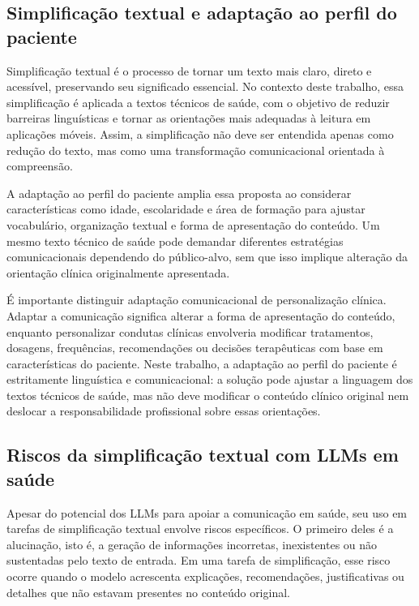 \subsection{Simplificação textual e adaptação ao perfil do paciente}
\label{sec:simplificacao-textual-adaptacao-perfil-paciente}

Simplificação textual é o processo de tornar um texto mais claro, direto e acessível, preservando seu significado essencial. No contexto deste trabalho, essa simplificação é aplicada a textos técnicos de saúde, com o objetivo de reduzir barreiras linguísticas e tornar as orientações mais adequadas à leitura em aplicações móveis. Assim, a simplificação não deve ser entendida apenas como redução do texto, mas como uma transformação comunicacional orientada à compreensão.

A adaptação ao perfil do paciente amplia essa proposta ao considerar características como idade, escolaridade e área de formação para ajustar vocabulário, organização textual e forma de apresentação do conteúdo. Um mesmo texto técnico de saúde pode demandar diferentes estratégias comunicacionais dependendo do público-alvo, sem que isso implique alteração da orientação clínica originalmente apresentada.

É importante distinguir adaptação comunicacional de personalização clínica. Adaptar a comunicação significa alterar a forma de apresentação do conteúdo, enquanto personalizar condutas clínicas envolveria modificar tratamentos, dosagens, frequências, recomendações ou decisões terapêuticas com base em características do paciente. Neste trabalho, a adaptação ao perfil do paciente é estritamente linguística e comunicacional: a solução pode ajustar a linguagem dos textos técnicos de saúde, mas não deve modificar o conteúdo clínico original nem deslocar a responsabilidade profissional sobre essas orientações.

\subsection{Riscos da simplificação textual com LLMs em saúde}
\label{sec:riscos-simplificacao-textual-llms-saude}

Apesar do potencial dos LLMs para apoiar a comunicação em saúde, seu uso em tarefas de simplificação textual envolve riscos específicos. O primeiro deles é a alucinação, isto é, a geração de informações incorretas, inexistentes ou não sustentadas pelo texto de entrada. Em uma tarefa de simplificação, esse risco ocorre quando o modelo acrescenta explicações, recomendações, justificativas ou detalhes que não estavam presentes no conteúdo original.

